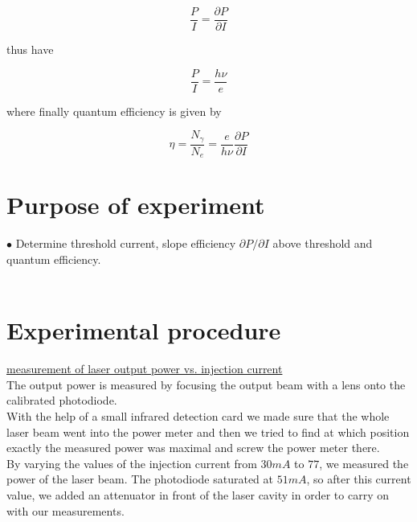 \documentclass[openany,11pt,a4paper]{book}
\begin{document}
\begin{equation}
\dfrac{P}{I} = \dfrac{\partial P}{\partial I}
\end{equation}

thus have 


\begin{equation}
\dfrac{P}{I} =  \dfrac{h \nu} {e}
\end{equation}


where finally quantum efficiency is given by


\begin{equation}
\eta = \dfrac{N_{\gamma}}{N_{e}} = \dfrac{e}{h \nu} \dfrac{\partial P}{\partial I}
\end{equation}





\section*{Purpose of experiment}

$\bullet $ Determine threshold current, slope efficiency $\partial P  /  \partial I$ above
threshold and quantum efficiency. \\\\




\section*{ Experimental procedure}


\underline{measurement of laser output power vs. injection current}\\




The output power is measured by focusing the output beam with a lens onto the calibrated photodiode.\\

With the help of a small infrared detection card we made sure that the whole laser beam went into the power meter and then we tried to find at which position exactly the measured power was maximal and screw the power meter there.\\

By varying the values of the injection current from $30 mA$ to $77$, we measured the power of the laser beam. The photodiode saturated at $51 mA$, so after this current value, we added an attenuator in front of the laser cavity in order to carry on with our measurements.\\ 
\end{document}
